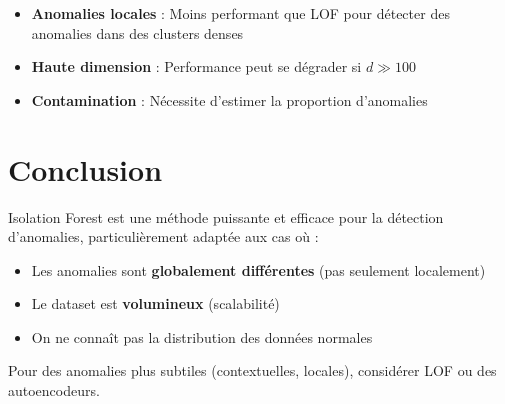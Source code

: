 \documentclass[a4paper,11pt]{article}
\begin{document}
\begin{itemize}
    \item \textbf{Anomalies locales} : Moins performant que LOF pour détecter des anomalies dans des clusters denses
    \item \textbf{Haute dimension} : Performance peut se dégrader si $d \gg 100$
    \item \textbf{Contamination} : Nécessite d'estimer la proportion d'anomalies
\end{itemize}

\section{Conclusion}

Isolation Forest est une méthode puissante et efficace pour la détection d'anomalies, particulièrement adaptée aux cas où :
\begin{itemize}
    \item Les anomalies sont \textbf{globalement différentes} (pas seulement localement)
    \item Le dataset est \textbf{volumineux} (scalabilité)
    \item On ne connaît pas la distribution des données normales
\end{itemize}

Pour des anomalies plus subtiles (contextuelles, locales), considérer LOF ou des autoencodeurs.
\end{document}
